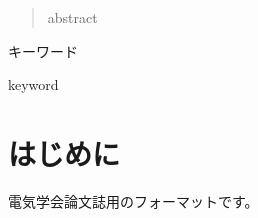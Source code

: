 \documentclass[usejistfm]{ieej}
\begin{document}
\begin{abstract}
abstract
\end{abstract}
\begin{jkeyword}
キーワード
\end{jkeyword}
\begin{ekeyword}
keyword
\end{ekeyword}
\maketitle

\section{はじめに}
電気学会論文誌用のフォーマットです。

\begin{thebibliography}{99}%
\bibitem{}
\bibitem{}
\end{thebibliography}

\appendix
\section{}

\begin{biography}
\profile{}{}{}
\end{biography}
\end{document}

